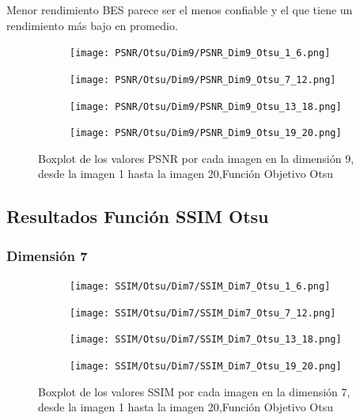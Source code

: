 \documentclass[conference]{IEEEtran}
\begin{document}
\noindent Menor rendimiento BES parece ser el menos confiable y el que tiene un rendimiento más bajo en promedio.
\begin{figure}
	\centering
	\begin{subfigure}{0.4\textwidth}
		\texttt{[image: PSNR/Otsu/Dim9/PSNR\_Dim9\_Otsu\_1\_6.png]}
	\end{subfigure}
	
	\begin{subfigure}{0.4\textwidth}
		\texttt{[image: PSNR/Otsu/Dim9/PSNR\_Dim9\_Otsu\_7\_12.png]}
	\end{subfigure}
	\begin{subfigure}{0.4\textwidth}
		\texttt{[image: PSNR/Otsu/Dim9/PSNR\_Dim9\_Otsu\_13\_18.png]}
	\end{subfigure}
	\begin{subfigure}{0.4\textwidth}
		\texttt{[image: PSNR/Otsu/Dim9/PSNR\_Dim9\_Otsu\_19\_20.png]}
		\vspace{-120pt} %
	\end{subfigure}
	\caption{Boxplot de los valores PSNR por cada imagen en la dimensión 9, desde la imagen 1 hasta la imagen 20,Función Objetivo Otsu}
	\label{fig:imagenes}    
\end{figure}

\subsection{Resultados Función SSIM Otsu}
\subsubsection{Dimensión 7}
\begin{figure}
	\centering
	\begin{subfigure}{0.4\textwidth}
		\texttt{[image: SSIM/Otsu/Dim7/SSIM\_Dim7\_Otsu\_1\_6.png]}
	\end{subfigure}
	
	\begin{subfigure}{0.4\textwidth}
		\texttt{[image: SSIM/Otsu/Dim7/SSIM\_Dim7\_Otsu\_7\_12.png]}
	\end{subfigure}
	\begin{subfigure}{0.4\textwidth}
		\texttt{[image: SSIM/Otsu/Dim7/SSIM\_Dim7\_Otsu\_13\_18.png]}
	\end{subfigure}
	\begin{subfigure}{0.4\textwidth}
		\texttt{[image: SSIM/Otsu/Dim7/SSIM\_Dim7\_Otsu\_19\_20.png]}
		\vspace{-120pt} %
	\end{subfigure}
	\caption{Boxplot de los valores SSIM por cada imagen en la dimensión 7, desde la imagen 1 hasta la imagen 20,Función Objetivo Otsu}
	\label{fig:imagenes}    
\end{figure}
\end{document}
